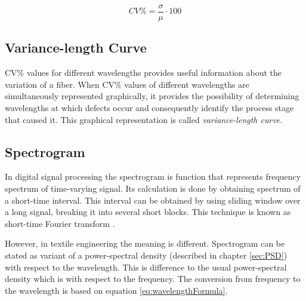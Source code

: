 \documentclass[twoside]{ctuthesis}
\theoremstyle{plain}
\theoremstyle{definition}
\theoremstyle{note}
\begin{document}
\begin{equation} \label{eq:CVCalculationIntroduction}
 CV\% = \frac{\sigma}{\mu} \cdot 100
\end{equation}

\subsection{Variance-length Curve}
\label{sec:VarianceL_curve}
CV\% values for different wavelengths provides useful information about the variation of a fiber. When CV\% values of different wavelengths are simultaneously represented graphically, it provides the possibility of determining wavelengths at which defects occur and consequently identify the process stage that caused it. This graphical representation is called \textit{variance-length curve}.

\subsection{Spectrogram}
\label{SpecExplained}
In digital signal processing the spectrogram is function that represents frequency spectrum of time-varying signal. Its calculation is done by obtaining spectrum of a short-time interval. This interval can be obtained by using sliding window over a long signal, breaking it into several short blocks. This technique is known as short-time Fourier transform \cite{cite:RT_DSP}. 

However, in textile engineering the meaning is different. Spectrogram can be stated as variant of a power-spectral density (described in chapter \ref{sec:PSD}) with respect to the wavelength. This is difference to the usual power-spectral density which is with respect to the frequency. The conversion from frequency to the wavelength is based on equation \ref{eq:wavelengthFormula}.
\end{document}
